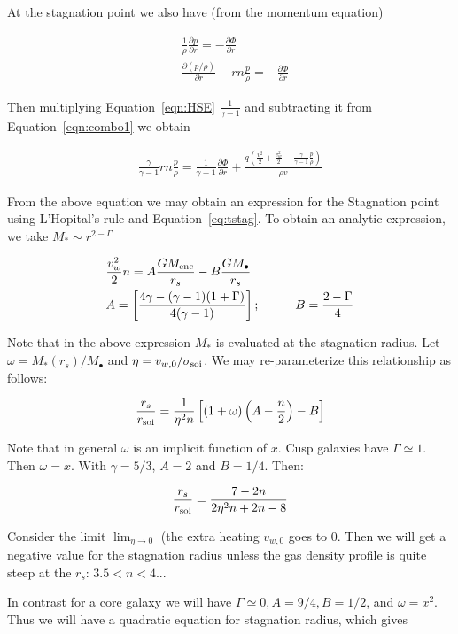 \documentclass[usenatbib,fleqn]{mn2e}
\newcommand{\rs}{r_s}
\newcommand{\dxdy}[2]{\frac{\partial #1}{\partial #2} }
\newcommand{\ddr}[1]{\dxdy{#1}{r}}
\newcommand{\dpdr}{\dxdy{p}{r}}
\newcommand{\dphidr}{\dxdy{\Phi}{r}}
\newcommand{\ke}{\frac{v^2}{2}}
\newcommand{\kew}{\frac{v_w^2}{2}}
\newcommand{\gammaf}{\frac{\gamma}{\gamma-1}}
\newcommand{\cs}{\frac{p}{\rho}}
\newcommand{\Q}{q (\ke+\kew-\gammaf \cs)}
\newcommand{\Menc}{M_{\rm enc}}
\newcommand{\Mstar}{M_{*}}
\newcommand{\Mbh}[1][]{M_{\bullet#1}}
\newcommand{\phirs}{\frac{G \Menc}{\rs}}
\newcommand{\soi}{\rm soi}
\newcommand{\rsoi}{r_{\soi}}
\newcommand{\vwO}{v_{w,0}}
\newcommand{\x}{\frac{r_s}{\rsoi}}
\begin{document}
At the stagnation point we also have (from the momentum equation)

\begin{align}
&\frac{1}{\rho}\dpdr=-\dphidr\\
&\ddr{(p/\rho)}-r n \cs=-\dphidr \label{eqn:HSE}
\end{align}

Then multiplying Equation~\ref{eqn:HSE}  $\frac{1}{\gamma-1}$ and subtracting it from Equation~\ref{eqn:combo1} we obtain

\begin{align}
\gammaf r n \cs = \frac{1}{\gamma-1} \dphidr + \frac{\Q}{\rho  v}
\end{align}

From the above equation we may obtain an expression for the Stagnation point using L'Hopital's rule and Equation~\ref{eq:tstag}. To obtain an analytic expression, we take $\Mstar\sim r^{2-\Gamma}$

\begin{align}
&\kew n =A \phirs -B \frac{G \Mbh}{\rs}\\
&A=\left[\frac{4\gamma-(\gamma-1)(1+\Gamma)}{4(\gamma-1)}\right]; \hspace{1cm} B=\frac{2-\Gamma}{4} \label{eq:stag_analytic}
\end{align}

Note that in the above expression $\Mstar$ is evaluated at the stagnation radius. Let $\omega=\Mstar(\rs)/\Mbh$ and 
$\eta=v_{w,0}/\sigma_{\rm soi}$. We may re-parameterize this relationship as follows:

\begin{align}
\x=\frac{1}{\eta^2 n}\left[ (1+\omega)\left(A-\frac{n}{2}\right)-B\right]
\end{align}

Note that in general $\omega$ is an implicit function of $x$. Cusp galaxies have $\Gamma\simeq1$.  Then $\omega=x$. With $\gamma=5/3$, $A=2$ and $B=1/4$.  Then:

\begin{align}
\x=\frac{7-2n}{2\eta^2 n+2n-8}
\end{align}

Consider the limit $\lim_{\eta \to 0}$ (the extra heating $\vwO$ goes to 0. Then we will get a negative value for the stagnation radius unless the gas density profile is quite steep at the $\rs$: $3.5<n<4$...

In contrast for a core galaxy we will have $\Gamma\simeq0, A=9/4, B=1/2$, and  $\omega=x^2$. Thus we will have a quadratic equation for stagnation radius, which gives
\end{document}
